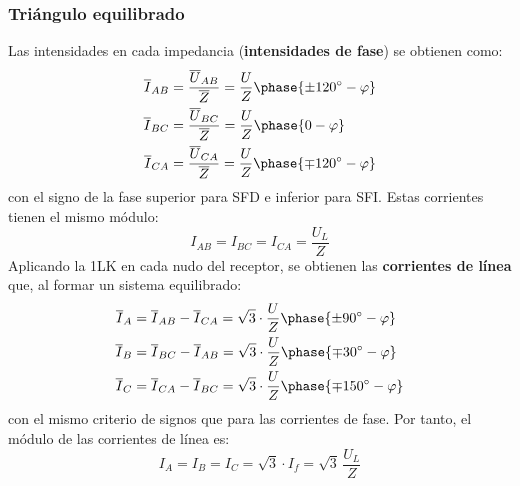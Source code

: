 	\subsubsection{Triángulo equilibrado}
	Las intensidades en cada impedancia (\textbf{intensidades de
          fase}) se obtienen como:
	\begin{align*}
          \overline{I}_{AB} &= \frac{\overline{U}_{AB}}{\overline{Z}} = \frac{U}{Z}\phase{{\pm 120^\circ} - \varphi} \\
          \overline{I}_{BC} &= \frac{\overline{U}_{BC}}{\overline{Z}} = \frac{U}{Z}\phase{0 - \varphi}\\
          \overline{I}_{CA} &= \frac{\overline{U}_{CA}}{\overline{Z}} = \frac{U}{Z}\phase{{\mp 120^\circ} - \varphi}
        \end{align*}
        con el signo de la fase superior para SFD e inferior para
        SFI. Estas corrientes tienen el mismo módulo:
        \begin{equation}
          \boxed{{I_{AB}}={I_{BC}}={I_{CA}} = \dfrac{U_L}{Z}}
        \end{equation}
        Aplicando la 1LK en cada nudo del receptor, se obtienen las
        \textbf{corrientes de línea} que, al formar un sistema
        equilibrado:
        \begin{align}
          \overline{I}_A &= \overline{I}_{AB} - \overline{I}_{CA} = \sqrt{3} \cdot \frac{U}{Z}\phase{{\pm 90^\circ} - \varphi}\\
          \overline{I}_B &= \overline{I}_{BC} - \overline{I}_{AB} = \sqrt{3} \cdot \frac{U}{Z}\phase{{\mp 30^\circ} - \varphi}\\
          \overline{I}_C &= \overline{I}_{CA} - \overline{I}_{BC} = \sqrt{3} \cdot \frac{U}{Z}\phase{{\mp 150^\circ} - \varphi}
        \end{align}
        con el mismo criterio de signos que para las corrientes de
        fase. Por tanto, el módulo de las corrientes de línea es:
        \begin{equation}
          \boxed{{I}_A = {I}_B = {I}_C = \sqrt{3} \cdot I_f = \sqrt{3}\,\frac{U_L}{Z}}
        \end{equation}
	
